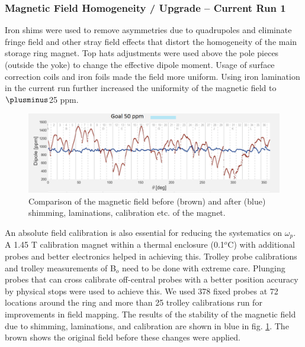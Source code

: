 \documentclass[journal,article,submit,moreauthors,pdftex,10pt,a4paper]{Definitions/mdpi}
\begin{document}
\subsubsection{Magnetic Field Homogeneity / Upgrade – Current Run 1}
Iron shims were used to remove asymmetries due to quadrupoles and eliminate fringe field and other stray field effects that 
distort the homogeneity of the main storage ring magnet. 
Top hats adjustments were used above the pole pieces (outside the yoke) to change the effective dipole moment.
Usage of surface correction coils and iron foils made the field more uniform. 
Using iron lamination in the current run further increased the uniformity of the magnetic field to $\plusminus$25 ppm.
\begin{figure}[H]
\centering
\includegraphics[width=12 cm]{shim_mfd.png}
\caption{\label{fig9}Comparison of the magnetic field before (brown) and after (blue) 
shimming, laminations, calibration etc. of the magnet. }
\end{figure} 
An absolute field calibration is also essential for reducing the systematics on $\omega_p$. 
A 1.45 T calibration magnet within a thermal enclosure (0.1$^o$C) with additional probes and better electronics 
helped in achieving this. 
Trolley probe calibrations and trolley measurements of B$_o$ need to be done with extreme care. 
Plunging probes that can cross calibrate off-central probes with a better position accuracy by physical stops 
were used to achieve this. We used 378 fixed probes at 72 locations around the ring and more than 
25 trolley calibrations run for improvements in field mapping. The results of the stability of the magnetic field due to 
shimming, laminations, and calibration are shown in blue in fig. \ref{fig9}. The brown shows the 
original field before these changes were applied. 
\end{document}
